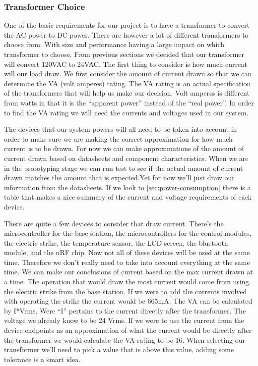 
\subsubsection{Transformer Choice}
One of the basic requirements for our project is to have a transformer to
convert the AC power to DC power. There are however a lot of different
transformers to choose from. With size and performance having a large impact on
which transformer to choose. From previous sections we decided that our
transformer will convert 120VAC to 24VAC. The first thing to consider is how
much current will our load draw. We first consider the amount of current drawn
so that we can determine the VA (volt amperes) rating. The VA rating is an
actual specification of the transformers that will help us make our decision.
Volt amperes is different from watts in that it is the {}``apparent power{}''
instead of the {}``real power{}''. In order to find the VA rating we will need the
currents and voltages used in our system.

The devices that our system powers will all need to be taken
into account in order to make sure we are making the correct approximation
for how much current is to be drawn. For now we can make approximations of
the amount of current drawn based on datasheets and component
characteristics. When we are in the prototyping stage we can run test to see
if the actual amount of current drawn matches the amount that is expected.Yet
for now we{}'ll just draw our information from the datasheets. If we look to
\autoref{sec:power-consumption} there is a table that makes a nice summary of the
current and voltage requirements of each device.

There are quite a few devices to consider that draw current.
There{}'s the microcontroller for the base station, the microcontrollers for
the control modules, the electric strike, the temperature sensor, the LCD
screen, the bluetooth module, and the nRF chip. Now not all of these devices
will be used at the same time. Therefore we don{}'t really need to take into
account everything at the same time. We can make our conclusions of current
based on the max current drawn at a time. The operation that would draw the
most current would come from using the electric strike from the base station.
If we were to add the currents involved with operating the strike the current
would be 665mA. The VA can be calculated by I*Vrms. Were {}``I{}'' pertains
to the current directly after the transformer. The voltage we already know to
be 24 Vrms. If we were to use the current from the device endpoints as an
approximation of what the current would be directly after the transformer we
would calculate the VA rating to be 16. When selecting our transformer we{}'ll
need to pick a value that is above this value, adding some tolerance is a smart
idea.

